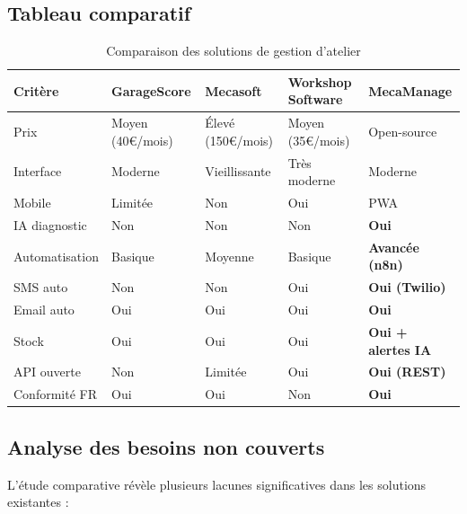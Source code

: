 \subsection{Tableau comparatif}

\begin{table}[h]
\centering
\small
\begin{tabularx}{\textwidth}{|l|X|X|X|X|}
\hline
\rowcolor{gray!20}
\textbf{Critère} & \textbf{GarageScore} & \textbf{Mecasoft} & \textbf{Workshop Software} & \textbf{MecaManage} \\
\hline
Prix & Moyen (40€/mois) & Élevé (150€/mois) & Moyen (35€/mois) & Open-source \\
\hline
Interface & Moderne & Vieillissante & Très moderne & Moderne \\
\hline
Mobile & Limitée & Non & Oui & PWA \\
\hline
IA diagnostic & Non & Non & Non & \textbf{Oui} \\
\hline
Automatisation & Basique & Moyenne & Basique & \textbf{Avancée (n8n)} \\
\hline
SMS auto & Non & Non & Oui & \textbf{Oui (Twilio)} \\
\hline
Email auto & Oui & Oui & Oui & \textbf{Oui} \\
\hline
Stock & Oui & Oui & Oui & \textbf{Oui + alertes IA} \\
\hline
API ouverte & Non & Limitée & Oui & \textbf{Oui (REST)} \\
\hline
Conformité FR & Oui & Oui & Non & \textbf{Oui} \\
\hline
\end{tabularx}
\caption{Comparaison des solutions de gestion d'atelier}
\end{table}

\subsection{Analyse des besoins non couverts}

L'étude comparative révèle plusieurs lacunes significatives dans les solutions existantes :

